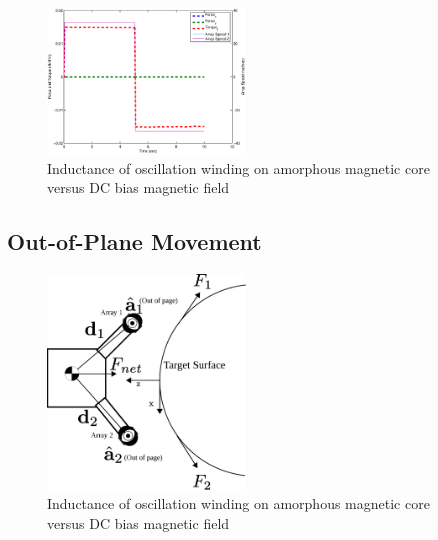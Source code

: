 \documentclass[letterpaper, 10 pt, conference]{ieeeconf}  %
\begin{document}
      \begin{figure}[thpb]
      \centering

      \includegraphics[width = 0.47\textwidth]{figures/planar_rotations.eps}
      \caption{Inductance of oscillation winding on amorphous
       magnetic core versus DC bias magnetic field}
      \label{figurelabel}
   \end{figure}

\subsection{Out-of-Plane Movement}

   \begin{figure}[thpb]
      \centering

      \includegraphics[width = 0.47\textwidth]{figures/curve_locomotion.eps}
      \caption{Inductance of oscillation winding on amorphous
       magnetic core versus DC bias magnetic field}
      \label{figurelabel}
   \end{figure}
\end{document}
